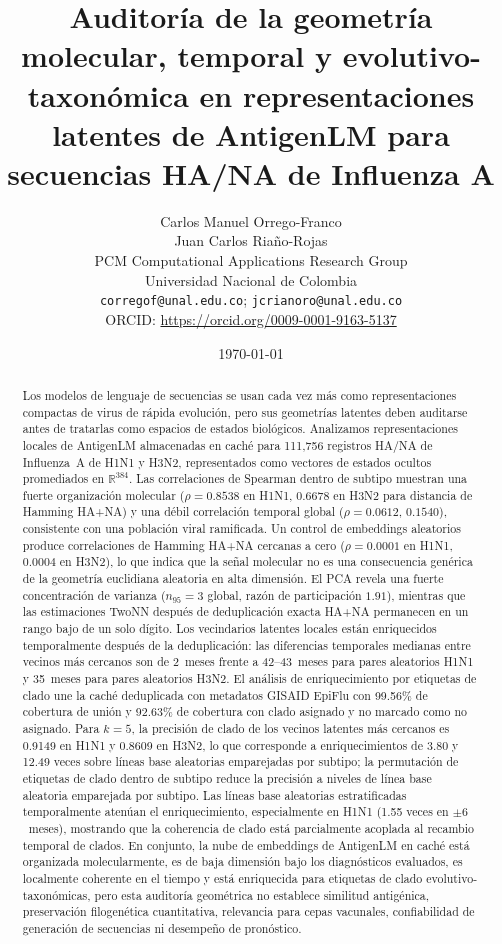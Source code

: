 \documentclass[11pt]{article}
\title{Auditoría de la geometría molecular, temporal y evolutivo-taxonómica en representaciones latentes de AntigenLM para secuencias HA/NA de Influenza A}
\author{
Carlos Manuel Orrego-Franco\\
Juan Carlos Riaño-Rojas\\
\vspace{0.4em}
\small PCM Computational Applications Research Group\\
\small Universidad Nacional de Colombia\\
\small \texttt{corregof@unal.edu.co}; \texttt{jcrianoro@unal.edu.co}\\
\small ORCID: \url{https://orcid.org/0009-0001-9163-5137}
}
\date{\today}
\newcommand{\R}{\mathbb{R}}
\begin{document}
\maketitle

\begin{abstract}
Los modelos de lenguaje de secuencias se usan cada vez más como representaciones compactas de virus de rápida evolución, pero sus geometrías latentes deben auditarse antes de tratarlas como espacios de estados biológicos. Analizamos representaciones locales de AntigenLM almacenadas en caché para 111,756 registros HA/NA de Influenza~A de H1N1 y H3N2, representados como vectores de estados ocultos promediados en $\R^{384}$. Las correlaciones de Spearman dentro de subtipo muestran una fuerte organización molecular ($\rho = 0.8538$ en H1N1, $0.6678$ en H3N2 para distancia de Hamming HA+NA) y una débil correlación temporal global ($\rho = 0.0612$, $0.1540$), consistente con una población viral ramificada. Un control de embeddings aleatorios produce correlaciones de Hamming HA+NA cercanas a cero ($\rho = 0.0001$ en H1N1, $0.0004$ en H3N2), lo que indica que la señal molecular no es una consecuencia genérica de la geometría euclidiana aleatoria en alta dimensión. El PCA revela una fuerte concentración de varianza ($n_{95}=3$ global, razón de participación $1.91$), mientras que las estimaciones TwoNN después de deduplicación exacta HA+NA permanecen en un rango bajo de un solo dígito. Los vecindarios latentes locales están enriquecidos temporalmente después de la deduplicación: las diferencias temporales medianas entre vecinos más cercanos son de 2~meses frente a 42--43~meses para pares aleatorios H1N1 y 35~meses para pares aleatorios H3N2. El análisis de enriquecimiento por etiquetas de clado une la caché deduplicada con metadatos GISAID EpiFlu con 99.56\% de cobertura de unión y 92.63\% de cobertura con clado asignado y no marcado como no asignado. Para $k=5$, la precisión de clado de los vecinos latentes más cercanos es 0.9149 en H1N1 y 0.8609 en H3N2, lo que corresponde a enriquecimientos de 3.80 y 12.49 veces sobre líneas base aleatorias emparejadas por subtipo; la permutación de etiquetas de clado dentro de subtipo reduce la precisión a niveles de línea base aleatoria emparejada por subtipo. Las líneas base aleatorias estratificadas temporalmente atenúan el enriquecimiento, especialmente en H1N1 (1.55 veces en $\pm 6$~meses), mostrando que la coherencia de clado está parcialmente acoplada al recambio temporal de clados. En conjunto, la nube de embeddings de AntigenLM en caché está organizada molecularmente, es de baja dimensión bajo los diagnósticos evaluados, es localmente coherente en el tiempo y está enriquecida para etiquetas de clado evolutivo-taxonómicas, pero esta auditoría geométrica no establece similitud antigénica, preservación filogenética cuantitativa, relevancia para cepas vacunales, confiabilidad de generación de secuencias ni desempeño de pronóstico.
\end{abstract}
\end{document}
